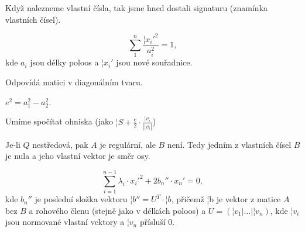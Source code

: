 \documentclass[12pt]{article}					%
\begin{document}
\begin{poznamka}
	Když nalezneme vlastní čísla, tak jsme hned dostali signaturu (znamínka vlastních čísel).
\end{poznamka}

\begin{definice}
	$$ \sum_1^n \frac{{¦x_i'}^2}{a_i^2} = 1, $$
	kde $a_i$ jsou délky poloos a $¦x_i'$ jsou nové souřadnice.

	\begin{dusledekin}
		Odpovídá matici v diagonálním tvaru.
	\end{dusledekin}
\end{definice}

\begin{tvrzeni}
	$e^2 = a_1^2 - a_2^2$.

	\begin{dusledek}
		Umíme spočítat ohniska (jako $¦S + \frac{e}{2}·\frac{¦v_i}{|¦v_i|}$)
	\end{dusledek}
\end{tvrzeni}

\begin{poznamka}[Nestředové]
	Je-li $Q$ nestředová, pak $A$ je regulární, ale $B$ není. Tedy jedním z vlastních čísel $B$ je nula a jeho vlastní vektor je směr osy.
\end{poznamka}


\begin{definice}
	$$ \sum_{i=1}^{n-1} λ_i·{x_i'}^2 + 2b_n''·x_n' = 0, $$
	kde $b_n''$ je poslední složka vektoru $¦b'' = U^T·¦b$, přičemž ¦b je vektor z matice $A$ bez $B$ a rohového členu (stejně jako v délkách poloos) a $U = (¦v_1 | … | ¦v_n)$, kde $¦v_i$ jsou normované vlastní vektory a $¦v_n$ přísluší 0.
\end{definice}
\end{document}
